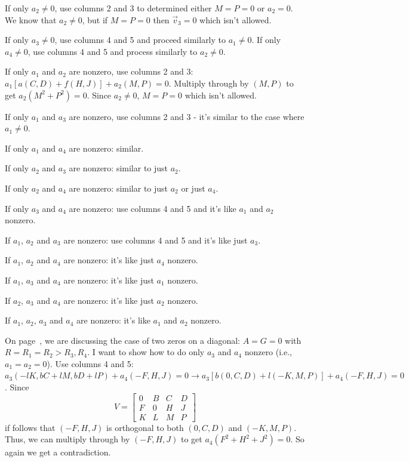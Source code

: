 If only $a_2 \neq 0$, use columns 2 and 3 to determined either $M = P = 0$ or
$a_2 = 0$.  We know that $a_2 \neq 0$, but if $M = P = 0$ then $\vec{v}_3 = 0$
which isn't allowed.

If only $a_3 \neq 0$, use columns 4 and 5 and proceed similarly to $a_1 \neq
0$.  If only $a_4 \neq 0$, use columns 4 and 5 and process similarly to $a_2 \neq
0$.

If only $a_1$ and $a_2$ are nonzero, use columns 2 and 3: $a_1[a(C,D)+f(H,J)]
+ a_2(M,P) = 0$.  Multiply through by $(M,P)$ to get $a_2(M^2+P^2) = 0$.
Since $a_2 \neq 0$, $M = P = 0$ which isn't allowed.

If only $a_1$ and $a_3$ are nonzero, use columns 2 and 3 - it's similar to the
case where $a_1 \neq 0$.

If only $a_1$ and $a_4$ are nonzero: similar.

If only $a_2$ and $a_3$ are nonzero: similar to just $a_2$.

If only $a_2$ and $a_4$ are nonzero: similar to just $a_2$ or just $a_4$.

If only $a_3$ and $a_4$ are nonzero: use columns 4 and 5 and it's like $a_1$
and $a_2$ nonzero.

If $a_1$, $a_2$ and $a_3$ are nonzero: use columns 4 and 5 and it's like just $a_3$.

If $a_1$, $a_2$ and $a_4$ are nonzero: it's like just $a_4$ nonzero.

If $a_1$, $a_3$ and $a_4$ are nonzero: it's like just $a_1$ nonzero.

If $a_2$, $a_3$ and $a_4$ are nonzero: it's like just $a_2$ nonzero.

If $a_1$, $a_2$, $a_3$ and $a_4$ are nonzero: it's like $a_1$ and $a_2$ nonzero.

On page~\pageref{refpage7}, we are discussing the case of two zeros on a
diagonal:  $A = G = 0$ with $R = R_1 = R_2 > R_3, R_4$.  I want to show how to
do only $a_3$ and $a_4$ nonzero (i.e., $a_1 = a_2 = 0$).  Use columns 4 and 5:
$a_3(-lK,bC+lM,bD+lP) + a_4(-F,H,J) = 0 \rightarrow a_3[b(0,C,D)+l(-K,M,P)] +
a_4 (-F,H,J) = 0$.  Since
\begin{equation*}
V =
\begin{bmatrix}
0 & B & C & D \\
F & 0 & H & J \\
K & L & M & P
\end{bmatrix}
\end{equation*}
if follows that $(-F,H,J)$ is orthogonal to both $(0,C,D)$ and $(-K,M,P)$.
Thus, we can multiply through by $(-F,H,J)$ to get $a_4(F^2+H^2+J^2) = 0$.  So
again we get a contradiction.

